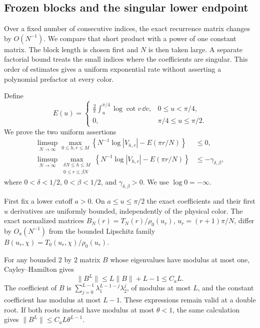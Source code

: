 \subsection{Frozen blocks and the singular lower endpoint}

Over a fixed number of consecutive indices, the exact recurrence matrix changes by $O(N^{-1})$. We compare that short product with a power of one constant matrix. The block length is chosen first and $N$ is then taken large. A separate factorial bound treats the small indices where the coefficients are singular. This order of estimates gives a uniform exponential rate without asserting a polynomial prefactor at every color.

Define
\begin{equation}\label{eq:b2-envelope-action}
 E(u)=
 \begin{cases}
 \displaystyle\frac2\pi\int_u^{\pi/4}\log\cot v\,\dd v,
       &0\le u<\pi/4,\\
 0,&\pi/4\le u\le\pi/2.
 \end{cases}
\end{equation}
We prove the two uniform assertions
\begin{align}
 \limsup_{N\to\infty}
 \max_{0\le h,r\le M}
 \left\{N^{-1}\log|V_{h,r}|-E(\pi r/N)\right\}
 &\le0,\label{eq:b2-global-rate}\\
 \limsup_{N\to\infty}
 \max_{\substack{\delta N\le h\le M\\0\le r\le\beta N}}
 \left\{N^{-1}\log|V_{h,r}|-E(\pi r/N)\right\}
 &\le-\gamma_{\delta,\beta},
 \label{eq:b2-far-color}
\end{align}
where $0<\delta<1/2$, $0<\beta<1/2$, and
$\gamma_{\delta,\beta}>0$. We use $\log0=-\infty$.

First fix a lower cutoff $a>0$. On $a\le u\le\pi/2$ the exact
coefficients and their first $u$ derivatives are uniformly bounded,
independently of the physical color. The exact normalized matrices
$B_N(r)=T_N(r)/\rho_0(u_r)$, $u_r=(r+1)\pi/N$, differ by
$O_a(N^{-1})$ from the bounded Lipschitz family
$B(u_r,\chi)=T_0(u_r,\chi)/\rho_0(u_r)$.

For any bounded $2$ by $2$ matrix $B$ whose eigenvalues have modulus
at most one, Cayley--Hamilton gives
\begin{equation}\label{eq:b2-CH}
 \|B^L\|\le L\|B\|+L-1\le C_aL.
\end{equation}
The coefficient of $B$ is
$\sum_{j=0}^{L-1}\lambda_1^{L-1-j}\lambda_2^j$, of modulus at
most $L$, and the constant coefficient has modulus at most $L-1$.
These expressions remain valid at a double root. If both roots
instead have modulus at most $\theta<1$, the same calculation gives
$\|B^L\|\le C_aL\theta^{L-1}$.

